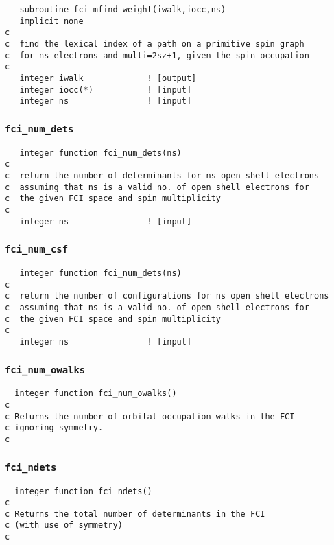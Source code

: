 \begin{verbatim}
   subroutine fci_mfind_weight(iwalk,iocc,ns)
   implicit none
c     
c  find the lexical index of a path on a primitive spin graph
c  for ns electrons and multi=2sz+1, given the spin occupation
c     
   integer iwalk             ! [output]
   integer iocc(*)           ! [input]
   integer ns                ! [input]
\end{verbatim}

\subsubsection{{\tt fci\_num\_dets}}
\label{sec:fcinumdets}
\begin{verbatim}
   integer function fci_num_dets(ns)
c
c  return the number of determinants for ns open shell electrons
c  assuming that ns is a valid no. of open shell electrons for
c  the given FCI space and spin multiplicity
c
   integer ns                ! [input]
\end{verbatim}

\subsubsection{{\tt fci\_num\_csf}}
\begin{verbatim}
   integer function fci_num_dets(ns)
c
c  return the number of configurations for ns open shell electrons
c  assuming that ns is a valid no. of open shell electrons for
c  the given FCI space and spin multiplicity
c
   integer ns                ! [input]
\end{verbatim}

\subsubsection{{\tt fci\_num\_owalks}}
\begin{verbatim}
  integer function fci_num_owalks()
c
c Returns the number of orbital occupation walks in the FCI
c ignoring symmetry.
c
\end{verbatim}

\subsubsection{{\tt fci\_ndets}}
\begin{verbatim}
  integer function fci_ndets()
c
c Returns the total number of determinants in the FCI
c (with use of symmetry)
c
\end{verbatim}

